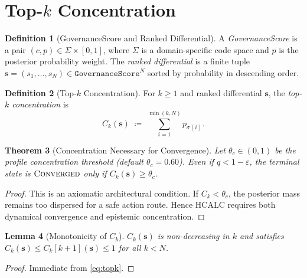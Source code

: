 \documentclass[11pt,a4paper]{article}
\theoremstyle{tealstyle}
\newtheorem{theorem}{Theorem}[section]
\newtheorem{lemma}[theorem]{Lemma}
\theoremstyle{definition}
\newtheorem{definition}[theorem]{Definition}
\newcommand{\eps}{\varepsilon}
\newcommand{\topk}{C_k}
\newcommand{\qwit}{q}
\newcommand{\GovScore}{\mathtt{GovernanceScore}}
\newcommand{\converged}{\textsc{Converged}}
\newcommand{\sigmarank}{\sigma}
\begin{document}
\section{Top-$k$ Concentration}
\label{sec:topk}

\begin{definition}[GovernanceScore and Ranked Differential]
\label{def:gov-score}
A \emph{GovernanceScore} is a pair $(c, p) \in \Sigma \times [0,1]$,
where $\Sigma$ is a domain-specific code space and $p$ is the posterior
probability weight.
The \emph{ranked differential} is a finite tuple
$\bm{s} = (s_1,\dots,s_N) \in \GovScore^N$
sorted by probability in descending order.
\end{definition}

\begin{definition}[Top-$k$ Concentration]
\label{def:topk}
For $k \ge 1$ and ranked differential $\bm{s}$, the
\emph{top-$k$ concentration} is
\begin{equation}
  \label{eq:topk}
  \topk(\bm{s}) \;\coloneqq\; \sum_{i=1}^{\min(k,N)} p_{\sigmarank(i)}.
\end{equation}
\end{definition}

\begin{theorem}[Concentration Necessary for Convergence]
\label{thm:topk}
Let $\theta_c \in (0,1)$ be the profile concentration threshold
(default $\theta_c = 0.60$).
Even if $\qwit < 1 - \eps$, the terminal state is
$\converged$ \emph{only if} $\topk(\bm{s}) \ge \theta_c$.
\end{theorem}

\begin{proof}
This is an axiomatic architectural condition.
If $\topk < \theta_c$, the posterior mass remains too dispersed for
a safe action route.
Hence HCALC requires both dynamical convergence and epistemic concentration.
\end{proof}

\begin{lemma}[Monotonicity of $\topk$]
\label{lem:topk-mono}
$\topk(\bm{s})$ is non-decreasing in $k$ and satisfies
$\topk(\bm{s}) \le \topk[k+1](\bm{s}) \le 1$ for all $k < N$.
\end{lemma}

\begin{proof}
Immediate from \eqref{eq:topk}.
\end{proof}

\end{document}
